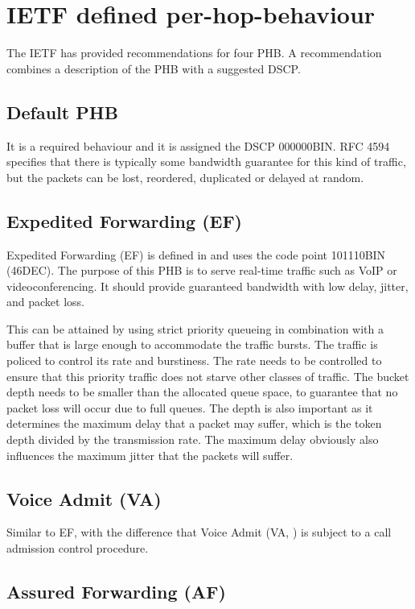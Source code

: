 \section{IETF defined per-hop-behaviour}
The IETF has provided recommendations for four PHB.
A recommendation combines a description of the PHB with a suggested DSCP.

\subsection{Default PHB}

It is a required behaviour and it is assigned the DSCP 000000BIN.
RFC 4594 \cite{rfc4594} specifies that there is typically some bandwidth guarantee for this kind of traffic, but the packets can be lost, reordered, duplicated or delayed at random.

\subsection{Expedited Forwarding (EF)}
Expedited Forwarding (EF) is defined in \cite{rfc3246} and uses the code point 101110BIN (46DEC).
The purpose of this PHB is to serve real-time traffic such as VoIP or videoconferencing.
It should provide guaranteed bandwidth with low delay, jitter, and packet loss.

This can be attained by using strict priority queueing in combination with a buffer that is large enough to accommodate the traffic bursts.
The traffic is policed to control its rate and burstiness.
The rate needs to be controlled to ensure that this priority traffic does not starve other classes of traffic.
The bucket depth needs to be smaller than the allocated queue space, to guarantee that no packet loss will occur due to full queues.
The depth is also important as it determines the maximum delay that a packet may suffer, which is the token depth divided by the transmission rate.
The maximum delay obviously also influences the maximum jitter that the packets will suffer.

\subsection{Voice Admit (VA)}

Similar to EF, with the difference that Voice Admit (VA, \cite{rfc5865}) is subject to a call admission control procedure.

\subsection{Assured Forwarding (AF)}

